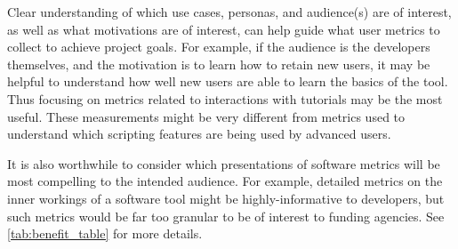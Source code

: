 \documentclass{article}
\begin{document}
Clear understanding of which use cases, personas, and audience(s) are of interest, as well as what motivations are of interest, can help guide what user metrics to collect to achieve project goals.  For example, if the audience is the developers themselves, and the motivation is to learn how to retain new users, it may be helpful to understand how well new users are able to learn the basics of the tool. Thus focusing on metrics related to interactions with tutorials may be the most useful. These measurements might be very different from metrics used to understand which scripting features are being used by advanced users. 

It is also worthwhile to consider which presentations of software metrics will be most compelling to the intended audience. For example, detailed metrics on the inner workings of a software tool might be highly-informative to developers, but such metrics would be far too granular to be of interest to funding agencies.  See \ref{tab:benefit_table} for more details.
 
\end{document}

